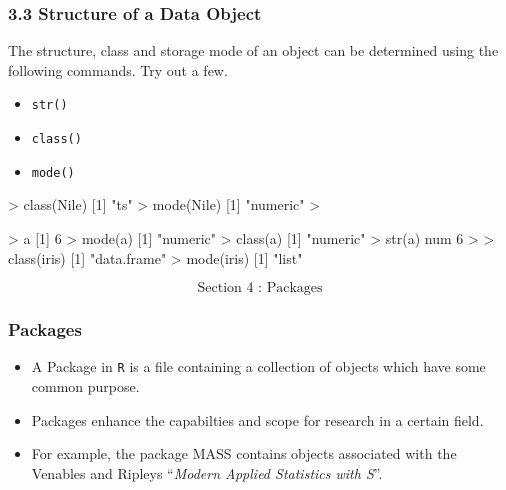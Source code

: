  
 
 
 \frametitle{3.3 Structure of a Data Object}
 \large
 The structure, class and storage mode of an object can be determined using the following
 commands. Try out a few.
 \begin{itemize}
 \item  \texttt{str()}
 \item  \texttt{class()}
 \item  \texttt{mode()}
 \end{itemize}
 
 
 
 
 \begin{framed}
 \begin{semiverbatim}
 > class(Nile)
 [1] "ts"
 > mode(Nile)
 [1] "numeric"
 >
 
 \end{semiverbatim}
 \end{framed}
 
 
 
 \begin{semiverbatim}
 > a
 [1] 6
 > mode(a)
 [1] "numeric"
 > class(a)
 [1] "numeric"
 > str(a)
 num 6
 >
 > class(iris)
 [1] "data.frame"
 > mode(iris)
 [1] "list"
 \end{semiverbatim}
 
 
 
 
 \Huge
 \[\mbox{ Section 4 : Packages } \]
 
 
 \frametitle{Packages}
 
 \begin{itemize}
 \item A Package in \texttt{R} is a file containing a collection of objects which have some common purpose.
 \item Packages enhance the capabilties and scope for research in a certain field. 
 \item For example, the
 package MASS contains objects associated with the Venables and Ripleys ``\textit{Modern Applied
 Statistics with S}”. 
 \end{itemize}
 
 
 
